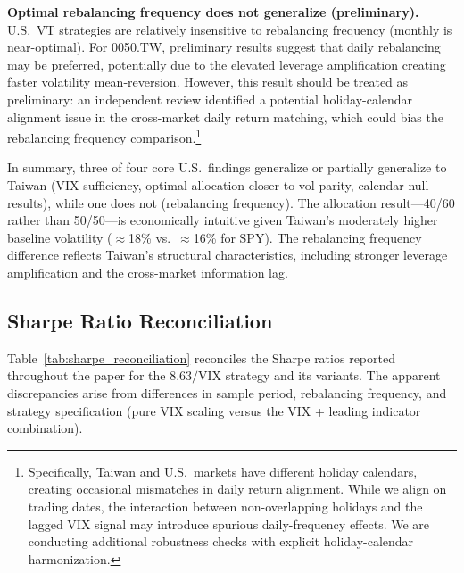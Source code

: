 \textbf{Optimal rebalancing frequency does not generalize (preliminary).} U.S.\ VT strategies are relatively insensitive to rebalancing frequency (monthly is near-optimal). For 0050.TW, preliminary results suggest that daily rebalancing may be preferred, potentially due to the elevated leverage amplification creating faster volatility mean-reversion. However, this result should be treated as preliminary: an independent review identified a potential holiday-calendar alignment issue in the cross-market daily return matching, which could bias the rebalancing frequency comparison.\footnote{Specifically, Taiwan and U.S.\ markets have different holiday calendars, creating occasional mismatches in daily return alignment. While we align on trading dates, the interaction between non-overlapping holidays and the lagged VIX signal may introduce spurious daily-frequency effects. We are conducting additional robustness checks with explicit holiday-calendar harmonization.}

In summary, three of four core U.S.\ findings generalize or partially generalize to Taiwan (VIX sufficiency, optimal allocation closer to vol-parity, calendar null results), while one does not (rebalancing frequency). The allocation result---40/60 rather than 50/50---is economically intuitive given Taiwan's moderately higher baseline volatility ($\approx$18\% vs.\ $\approx$16\% for SPY). The rebalancing frequency difference reflects Taiwan's structural characteristics, including stronger leverage amplification and the cross-market information lag.

\subsection{Sharpe Ratio Reconciliation}

Table~\ref{tab:sharpe_reconciliation} reconciles the Sharpe ratios reported throughout the paper for the $8.63/\text{VIX}$ strategy and its variants. The apparent discrepancies arise from differences in sample period, rebalancing frequency, and strategy specification (pure VIX scaling versus the VIX + leading indicator combination).

